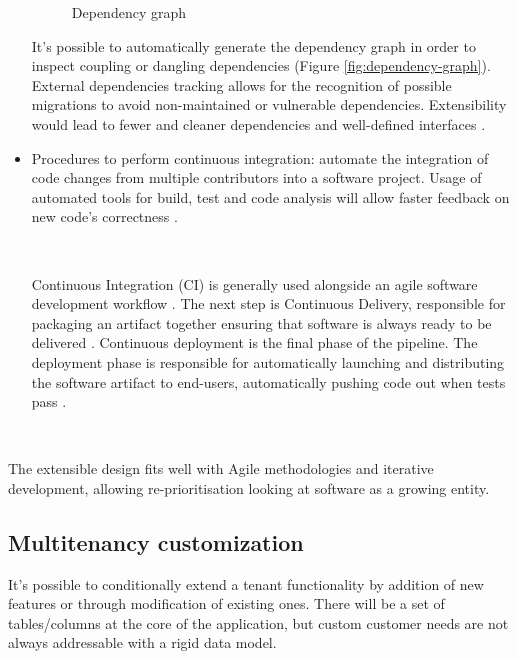 \documentclass[11pt,english]{article} %
\begin{document}
\begin{itemize}
\begin{figure}[H]
        \caption{Dependency graph}
    \end{figure}
    It's possible to automatically generate the dependency graph in order to inspect coupling or dangling dependencies (Figure \ref{fig:dependency-graph}). External dependencies tracking allows for the recognition of possible migrations to avoid non-maintained or vulnerable dependencies.
    Extensibility would lead to fewer and cleaner dependencies and well-defined interfaces \cite{philosophy-extensible-software}.
    \item Procedures to perform continuous integration: automate the integration of code changes from multiple contributors into a software project.
    Usage of automated tools for build, test and code analysis will allow faster feedback on new code’s correctness \cite{what-is-continuous-integration}.
    
    \
    
    Continuous Integration (CI) is generally used alongside an agile software development workflow \cite{what-is-continuous-integration}. 
    The next step is Continuous Delivery, responsible for packaging an artifact together ensuring that software is always ready to be delivered \cite{what-is-continuous-integration}.
    Continuous deployment is the final phase of the pipeline. The deployment phase is responsible for automatically launching and distributing the software artifact to end-users, automatically pushing code out when tests pass \cite{what-is-continuous-integration}.
\end{itemize}


\

The extensible design fits well with Agile methodologies and iterative development, allowing re-prioritisation \cite{philosophy-extensible-software} looking at software as a growing entity.



\subsection{Multitenancy customization}
It's possible to conditionally extend a tenant functionality by addition of new features or through modification of existing ones.
There will be a set of tables/columns at the core of the application, but custom customer needs are not always addressable with a rigid data model.
\end{document}

